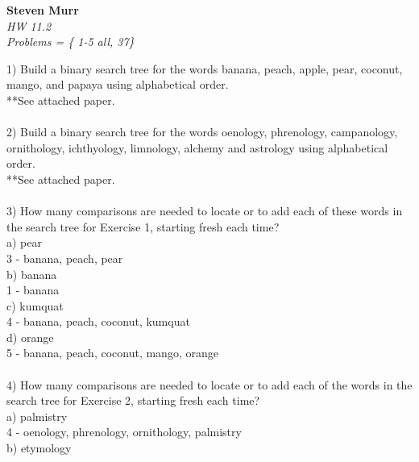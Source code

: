 \documentclass{article}
\begin{document}
\setcounter{totalnumber}{5}
   \begin{flushright}
      \Large\textbf{Steven Murr}\\
      \large\textit{HW 11.2} \\
      \large\textit{Problems = \{ 1-5 all, 37\}}
   \end{flushright}
\begin{flushleft}
\makeatletter%
\setlength{\@fptop}{5pt}
\makeatother

\setlength\parindent{0pt}1) Build a binary search tree for the words banana, peach, apple, pear, coconut, mango, and papaya using alphabetical order. \\
**See attached paper. \\
~\\
\setlength\parindent{0pt}2) Build a binary search tree for the words oenology, phrenology, campanology, ornithology, ichthyology, limnology, alchemy and astrology using alphabetical order. \\
**See attached paper. \\
~\\
\setlength\parindent{0pt}3) How many comparisons are needed to locate or to add each of these words in the search tree for Exercise 1, starting fresh each time? \\
\setlength\parindent{24pt}a) pear \\
\setlength\parindent{48pt} 3 - banana, peach, pear \\
\setlength\parindent{24pt}b) banana \\
\setlength\parindent{48pt} 1 - banana \\
\setlength\parindent{24pt}c) kumquat \\
\setlength\parindent{48pt} 4 - banana, peach, coconut, kumquat \\
\setlength\parindent{24pt}d) orange \\ 
\setlength\parindent{48pt} 5 - banana, peach, coconut, mango, orange \\
~\\
\setlength\parindent{0pt}4) How many comparisons are needed to locate or to add each of the words in the search tree for Exercise 2, starting fresh each time? \\
\setlength\parindent{24pt}a) palmistry \\
\setlength\parindent{48pt} 4 - oenology, phrenology, ornithology, palmistry \\
\setlength\parindent{24pt}b) etymology \\

\end{flushleft}
\end{document}
